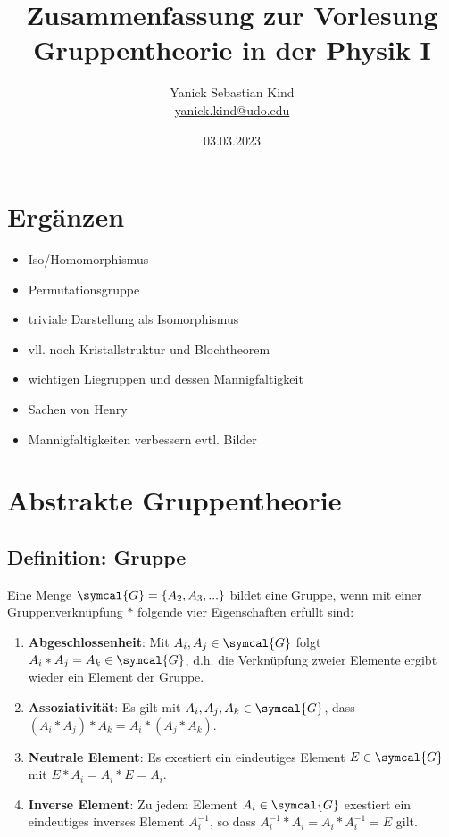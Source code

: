 \documentclass[
  captions=tableheading,  %
  titlepage=firstiscover, %
]{scrartcl}
\author{%
  Yanick Sebastian Kind\\%
  \href{mailto:yanick.kind@udo.edu}{yanick.kind@udo.edu}%
}
\title{Zusammenfassung zur Vorlesung Gruppentheorie in der Physik I}
\date{03.03.2023}
\begin{document}
\maketitle

\tableofcontents

\theoremstyle{remark}
\newtheorem{df}{Definition}
\listoftheorems


\newpage
\section{Ergänzen}
\begin{itemize}
  \item Iso/Homomorphismus
  \item Permutationsgruppe
  \item triviale Darstellung als Isomorphismus
  \item vll. noch Kristallstruktur und Blochtheorem 
  \item wichtigen Liegruppen und dessen Mannigfaltigkeit
  \item Sachen von Henry
  \item Mannigfaltigkeiten verbessern evtl. Bilder
\end{itemize}
\section{Abstrakte Gruppentheorie}
\subsection{Definition: Gruppe}
  Eine Menge $\symcal{G} = \{A_2,A_3,...\}$ bildet eine Gruppe, wenn mit einer Gruppenverknüpfung $*$ folgende vier Eigenschaften erfüllt sind:
  \begin{enumerate}
    \item \textbf{Abgeschlossenheit}: Mit $A_i, A_j \in \symcal{G}$ folgt $A_i * A_j = A_k \in \symcal{G}$, d.h. die Verknüpfung zweier 
    Elemente ergibt wieder ein Element der Gruppe.
    \item \textbf{Assoziativität}: Es gilt mit $A_i, A_j, A_k \in \symcal{G}$, dass $(A_i * A_j) * A_k = A_i * (A_j*A_k)$.
    \item \textbf{Neutrale Element}: Es exestiert ein eindeutiges Element $E\in \symcal{G}$ mit $E * A_i = A_i * E  = A_i$.
    \item \textbf{Inverse Element}: Zu jedem Element $A_i \in \symcal{G}$ exestiert ein eindeutiges inverses Element $A_i^{-1}$,
      so dass $A_i^{-1} * A_i = A_i * A_i^{-1} = E$ gilt.
  \end{enumerate}
\end{document}
